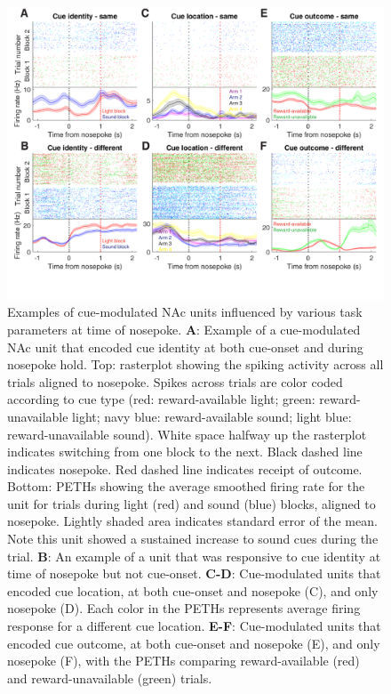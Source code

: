 \documentclass[11pt]{article}
\newcommand{\bsf}[1]{\textbf{#1}}
\begin{document}
{\begin{figure}[h]
\centering
\includegraphics[width=\textwidth]{Fig 9 - NP Neural examples.png}
\caption{Examples of cue-modulated NAc units influenced by various task
  parameters at time of nosepoke. \bsf{A}: Example of a cue-modulated NAc unit
  that encoded cue identity at both cue-onset and during nosepoke hold. Top:
  rasterplot showing the spiking activity across all trials aligned to
  nosepoke. Spikes across trials are color coded according to cue type (red:
  reward-available light; green: reward-unavailable light; navy blue:
  reward-available sound; light blue: reward-unavailable sound). White space
  halfway up the rasterplot indicates switching from one block to the
  next. Black dashed line indicates nosepoke. Red dashed line indicates receipt
  of outcome. Bottom: PETHs showing the average smoothed firing rate for the
  unit for trials during light (red) and sound (blue) blocks, aligned to
  nosepoke. Lightly shaded area indicates standard error of the mean. Note this
  unit showed a sustained increase to sound cues during the trial. \bsf{B}: An
  example of a unit that was responsive to cue identity at time of nosepoke but
  not cue-onset. \bsf{C-D}: Cue-modulated units that encoded cue location, at
  both cue-onset and nosepoke (C), and only nosepoke (D). Each color in the
  PETHs represents average firing response for a different cue
  location. \bsf{E-F}: Cue-modulated units that encoded cue outcome, at both
  cue-onset and nosepoke (E), and only nosepoke (F), with the PETHs comparing
  reward-available (red) and reward-unavailable (green) trials.}
\label{fig:NP_examples}
\end{figure}

}
\end{document}

